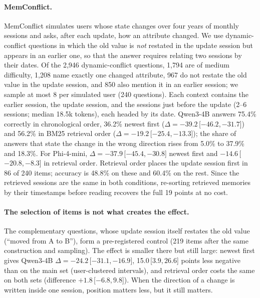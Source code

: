 \documentclass[11pt]{article}
\newcommand{\ci}[2]{\,[$#1$,\,$#2$]}
\begin{document}
\paragraph{MemConflict.}
MemConflict simulates users whose state changes over four years of monthly sessions and asks, after each update, how an attribute changed.
We use dynamic-conflict questions in which the old value is \emph{not} restated in the update session but appears in an earlier one, so that the answer requires relating two sessions by their dates. Of the 2{,}946 dynamic-conflict questions, 1{,}794 are of medium difficulty, 1{,}208 name exactly one changed attribute, 967 do not restate the old value in the update session, and 850 also mention it in an earlier session; we sample at most 8 per simulated user (240 questions).
Each context contains the earlier session, the update session, and the sessions just before the update (2--6 sessions; median 18.5k tokens), each headed by its date.
Qwen3-4B answers 75.4\% correctly in chronological order, 36.2\% newest first ($\Delta = -39.2$\ci{-46.2}{-31.7}) and 56.2\% in BM25 retrieval order ($\Delta = -19.2$\ci{-25.4}{-13.3}); the share of answers that state the change in the wrong direction rises from 5.0\% to 37.9\% and 18.3\%. For Phi-4-mini, $\Delta = -37.9$\ci{-45.4}{-30.8} newest first and $-14.6$\ci{-20.8}{-8.3} in retrieval order.
Retrieval order places the update session first in 86 of 240 items; accuracy is 48.8\% on these and 60.4\% on the rest.
Since the retrieved sessions are the same in both conditions, re-sorting retrieved memories by their timestamps before reading recovers the full 19 points at no cost.

\paragraph{The selection of items is not what creates the effect.}
The complementary questions, whose update session itself restates the old value (``moved from A to B''), form a pre-registered control (219 items after the same construction and sampling). The effect is smaller there but still large: newest first gives Qwen3-4B $\Delta = -24.2$\ci{-31.1}{-16.9}, 15.0\ci{3.9}{26.6} points less negative than on the main set (user-clustered intervals), and retrieval order costs the same on both sets (difference $+1.8$\ci{-6.8}{9.8}). When the direction of a change is written inside one session, position matters less, but it still matters.

\end{document}
